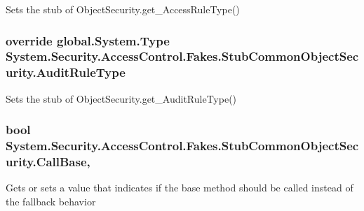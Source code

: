 Sets the stub of Object\-Security.\-get\-\_\-\-Access\-Rule\-Type()

\hypertarget{class_system_1_1_security_1_1_access_control_1_1_fakes_1_1_stub_common_object_security_a6a24615ed27cda6e2bbcccc10abcbf85}{
\subsubsection[{Audit\-Rule\-Type}]{\setlength{\rightskip}{0pt plus 5cm}override global.\-System.\-Type System.\-Security.\-Access\-Control.\-Fakes.\-Stub\-Common\-Object\-Security.\-Audit\-Rule\-Type\hspace{0.3cm}{\ttfamily [get]}}}\label{class_system_1_1_security_1_1_access_control_1_1_fakes_1_1_stub_common_object_security_a6a24615ed27cda6e2bbcccc10abcbf85}


Sets the stub of Object\-Security.\-get\-\_\-\-Audit\-Rule\-Type()

\hypertarget{class_system_1_1_security_1_1_access_control_1_1_fakes_1_1_stub_common_object_security_ac2cad71e9ed249039ebd22eb3bf2cd3d}{
\subsubsection[{Call\-Base}]{\setlength{\rightskip}{0pt plus 5cm}bool System.\-Security.\-Access\-Control.\-Fakes.\-Stub\-Common\-Object\-Security.\-Call\-Base\hspace{0.3cm}{\ttfamily [get]}, {\ttfamily [set]}}}\label{class_system_1_1_security_1_1_access_control_1_1_fakes_1_1_stub_common_object_security_ac2cad71e9ed249039ebd22eb3bf2cd3d}


Gets or sets a value that indicates if the base method should be called instead of the fallback behavior

